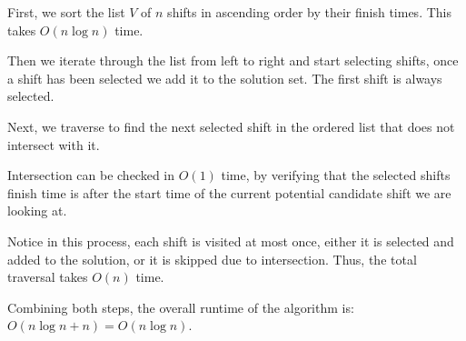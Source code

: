 \begin{soln}
	First, we sort the list \( V \) of \( n \) shifts in ascending order by their finish times. This takes \( O(n \log n) \) time.

	Then we iterate through the list from left to right and start selecting shifts, once a shift has been selected we add it to the solution set.
	The first shift is always selected.

	Next, we traverse to find the next selected shift in the ordered list that does not intersect with it.

	Intersection can be checked in \(O(1)\) time, by verifying that the selected shifts finish time is after the start time of the current potential candidate shift we are looking at.

	Notice in this process, each shift is visited at most once, either it is selected and added to the solution, or it is skipped due to intersection. Thus, the total traversal takes \( O(n) \) time.

	Combining both steps, the overall runtime of the algorithm is: \(O(n \log n + n) = O(n \log n)\).
\end{soln}













